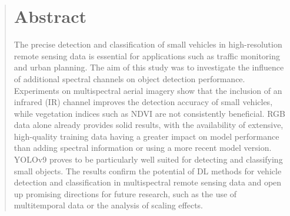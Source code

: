 \begin{abstract}
\section*{Abstract}
The precise detection and classification of small vehicles in high-resolution remote sensing data is essential for applications such as traffic monitoring and urban planning.
The aim of this study was to investigate the influence of additional spectral channels on object detection performance.
Experiments on multispectral aerial imagery show that the inclusion of an infrared (IR) channel improves the detection accuracy of small vehicles, while vegetation indices such as \acrshort{NDVI} are not consistently beneficial. \acrshort{RGB} data alone already provides solid results, with the availability of extensive, high-quality training data having a greater impact on model performance than adding spectral information or using a more recent model version. \acrshort{YOLO}v9 proves to be particularly well suited for detecting and classifying small objects.
The results confirm the potential of \Acrlong{DL} methods for vehicle detection and classification in multispectral remote sensing data and open up promising directions for future research, such as the use of multitemporal data or the analysis of scaling effects.
\end{abstract}



